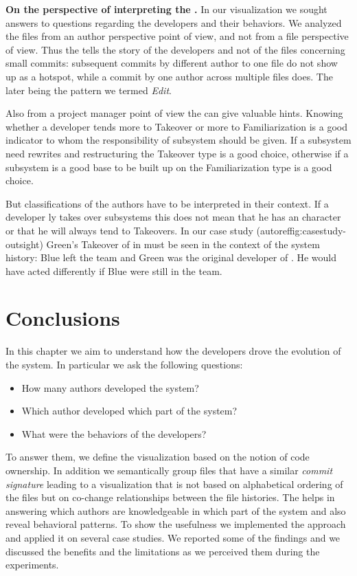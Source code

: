 \textbf{On the perspective of interpreting the \omap.} In our visualization we sought answers to questions regarding the developers and their behaviors. We analyzed the files from an author perspective point of view, and not from a file perspective of view. Thus the \omap tells the story of the developers and not of the files \eg concerning small commits: subsequent commits by different author to one file do not show up as a hotspot, while a commit by one author across multiple files does. The later being the pattern we termed \textit{Edit}.

Also from a project manager point of view the \omap can give valuable hints. Knowing whether a developer tends more to  Takeover or more to Familiarization is a good indicator to whom the responsibility of subsystem should be given. If a subsystem need rewrites and restructuring the Takeover type is a good choice, otherwise if a subsystem is a good base to be built up on the Familiarization type is a good choice.

But classifications of the authors have to be interpreted in their context. If a developer ly takes over subsystems this does not mean that he has an  character or that he will always tend to Takeovers. In our case study (autoref{fig:casestudy-outsight}) Green's Takeover of  in  must be seen in the context of the system history: Blue left the team and Green was the original developer of . He would have acted differently if Blue were still in the team.

\section{Conclusions}\label{sec:conclusions}

In this chapter we aim to understand how the developers drove the evolution of the system. In particular we ask the following questions:
\begin{itemize}
\item How many authors developed the system?
\item Which author developed which part of the system?
\item What were the behaviors of the developers?
\end{itemize}

To answer them, we define the \omap visualization based on the notion of code ownership. In addition we semantically group files that have a similar \emph{commit signature} leading to a visualization that is not  based on alphabetical ordering of the files but on co-change relationships between the file histories. The \omap helps in answering which authors are knowledgeable in which part of the system and also reveal behavioral patterns. To show the usefulness we implemented the approach and applied it on several case studies. We reported some of the findings and we discussed the benefits and the limitations as we perceived them during the experiments.


